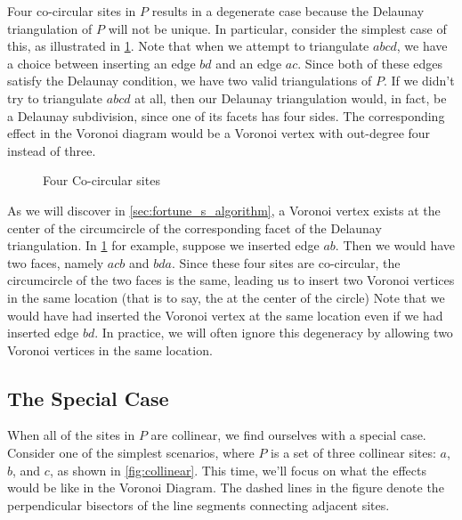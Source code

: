 \documentclass[12pt,twoside]{reedthesis}
\begin{document}
      Four co-circular sites in $P$ results in a degenerate case because the Delaunay triangulation of $P$ will not be unique. In particular, consider the simplest case of this, as illustrated in \cref{fig:co_circular}. Note that when we attempt to triangulate $abcd$, we have a choice between inserting an edge $bd$ and an edge $ac$. Since both of these edges satisfy the Delaunay condition, we have two valid triangulations of $P$. If we didn't try to triangulate $abcd$ at all, then our Delaunay triangulation would, in fact, be a Delaunay subdivision, since one of its facets has four sides. The corresponding effect in the Voronoi diagram would be a Voronoi vertex with out-degree four instead of three. 

      \begin{figure}[!htb]
        \centering
        
        \caption{Four Co-circular sites}
        \label{fig:co_circular}
      \end{figure}

      As we will discover in \cref{sec:fortune_s_algorithm}, a Voronoi vertex exists at the center of the circumcircle of the corresponding facet of the Delaunay triangulation. In \cref{fig:co_circular} for example, suppose we inserted edge $ab$. Then we would have two faces, namely $acb$ and $bda$. Since these four sites are co-circular, the circumcircle of the two faces is the same, leading us to insert two Voronoi vertices in the same location (that is to say, the at the center of the circle) Note that we would have had inserted the Voronoi vertex at the same location even if we had inserted edge $bd$. In practice, we will often ignore this degeneracy by allowing two Voronoi vertices in the same location.\par

    \subsection{The Special Case} %
    \label{sub:special_case}

      When all of the sites in $P$ are collinear, we find ourselves with a special case. Consider one of the simplest scenarios, where $P$ is a set of three collinear sites: $a$, $b$, and $c$, as shown in \cref{fig:collinear}. This time, we'll focus on what the effects would be like in the Voronoi Diagram. The dashed lines in the figure denote the perpendicular bisectors of the line segments connecting adjacent sites. \par  
\end{document}

